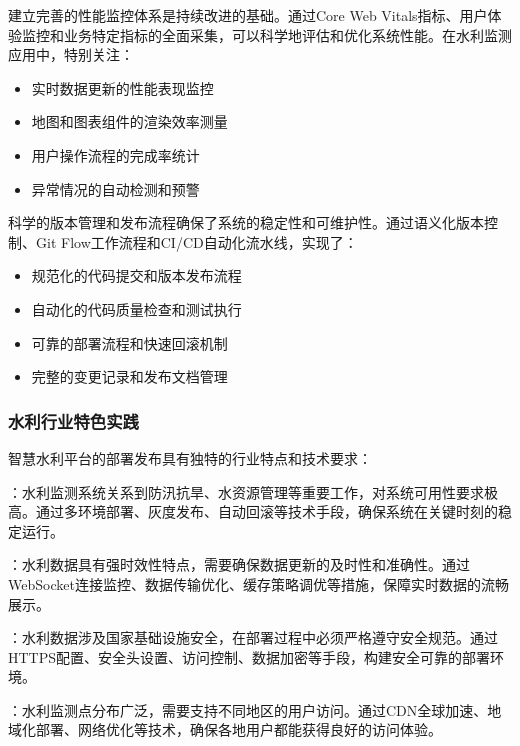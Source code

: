 
建立完善的性能监控体系是持续改进的基础。通过Core Web Vitals指标、用户体验监控和业务特定指标的全面采集，可以科学地评估和优化系统性能。在水利监测应用中，特别关注：

\begin{itemize}
\tightlist
\item
  实时数据更新的性能表现监控
\item
  地图和图表组件的渲染效率测量
\item
  用户操作流程的完成率统计
\item
  异常情况的自动检测和预警
\end{itemize}


科学的版本管理和发布流程确保了系统的稳定性和可维护性。通过语义化版本控制、Git Flow工作流程和CI/CD自动化流水线，实现了：

\begin{itemize}
\tightlist
\item
  规范化的代码提交和版本发布流程
\item
  自动化的代码质量检查和测试执行
\item
  可靠的部署流程和快速回滚机制
\item
  完整的变更记录和发布文档管理
\end{itemize}

\hypertarget{ux6c34ux5229ux884cux4e1aux7279ux8272ux5b9eux8df5}{%
\subsubsection{水利行业特色实践}\label{ux6c34ux5229ux884cux4e1aux7279ux8272ux5b9eux8df5}}

智慧水利平台的部署发布具有独特的行业特点和技术要求：

：水利监测系统关系到防汛抗旱、水资源管理等重要工作，对系统可用性要求极高。通过多环境部署、灰度发布、自动回滚等技术手段，确保系统在关键时刻的稳定运行。

：水利数据具有强时效性特点，需要确保数据更新的及时性和准确性。通过WebSocket连接监控、数据传输优化、缓存策略调优等措施，保障实时数据的流畅展示。

：水利数据涉及国家基础设施安全，在部署过程中必须严格遵守安全规范。通过HTTPS配置、安全头设置、访问控制、数据加密等手段，构建安全可靠的部署环境。

：水利监测点分布广泛，需要支持不同地区的用户访问。通过CDN全球加速、地域化部署、网络优化等技术，确保各地用户都能获得良好的访问体验。

